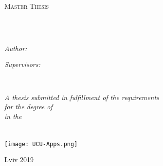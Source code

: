 \documentclass[
11pt, %
oneside, %
english, %
singlespacing, %
headsepline, %
]{MastersDoctoralThesis} %
\author{Oleksandr \textsc{Zaitsev}} %
\begin{document}
\frontmatter %

\pagestyle{plain} %


\begin{titlepage}
\begin{center}

\vspace*{.06\textheight}
{\scshape\LARGE \univname\par}\vspace{1.5cm} %
\textsc{\Large Master Thesis}\\[0.5cm] %

\HRule \\[0.4cm] %
{\huge \bfseries \ttitle\par}\vspace{0.4cm} %
\HRule \\[1.5cm] %

\begin{minipage}[t]{0.4\textwidth}
\begin{flushleft} \large
\emph{Author:}\\
\href{http://www.johnsmith.com}{\authorname} %
\end{flushleft}
\end{minipage}
\begin{minipage}[t]{0.4\textwidth}
\begin{flushright} \large
\emph{Supervisors:} \\
\href{http://www.jamessmith.com}{\supname} %
\end{flushright}
\end{minipage}\\[1.5cm]

\vfill

\large \textit{A thesis submitted in fulfillment of the requirements\\ for the degree of \degreename}\\[0.3cm] %
\textit{in the}\\[0.4cm]
\groupname\\\deptname\\[0.8cm] %

\vfill
\texttt{[image: UCU-Apps.png]} %

\vfill
{\large Lviv 2019}\\[4cm] %

\vfill
\end{center}
\end{titlepage}
\end{document}
